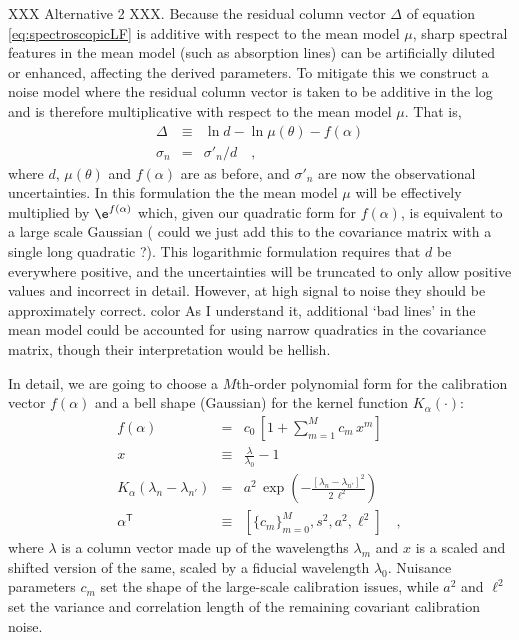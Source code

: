 \documentclass[iop,numberedappendix]{emulateapj}
\newcommand{\transpose}[1]{{#1}^{\!\mathsf T}}
\begin{document}
XXX Alternative 2 XXX.
Because the residual column vector $\Delta$ of equation
\ref{eq:spectroscopicLF} is additive with respect to the mean model
$\mu$, sharp spectral features in the mean model (such as absorption
lines) can be artificially diluted or enhanced, affecting the derived
parameters. To mitigate this we construct a noise model where the
residual column vector is taken to be additive in the log and is
therefore multiplicative with respect to the mean model $\mu$.  That
is,
\begin{eqnarray}\label{eq:spectroscopicLFalt2} 
\Delta &\equiv&
\ln d - \ln \mu(\theta) - f(\alpha) \\
\sigma_{n} & = & \sigma'_n / d
\quad ,
\end{eqnarray}
where $d$, $\mu(\theta)$ and $f(\alpha)$ are as before, and
$\sigma'_{n}$ are now the observational uncertainties. In this
formulation the the mean model $\mu$ will be effectively multiplied by
$\e ^{f(\alpha)}$ which, given our quadratic form for $f(\alpha)$, is
equivalent to a large scale Gaussian ({\color{red} could we just add
this to the covariance matrix with a single long quadratic ?}).  This
logarithmic formulation requires that $d$ be everywhere positive, and
the uncertainties will be truncated to only allow positive values and
incorrect in detail.  However, at high signal to noise they should be
approximately correct. {color{\red} As I understand it, additional
`bad lines' in the mean model could be accounted for using narrow
quadratics in the covariance matrix, though their interpretation would
be hellish.}



In detail, we are going to choose a $M$th-order polynomial form for
the calibration vector $f(\alpha)$ and a bell shape (Gaussian) for the
kernel function $K_\alpha(\cdot)$:
\begin{eqnarray}\displaystyle
f(\alpha) &=& c_0\,[1 + \sum_{m=1}^M c_m\,x^m]
\\
x &\equiv& \frac{\lambda}{\lambda_0} - 1
\\
K_\alpha(\lambda_n - \lambda_{n'}) &=& a^2\,\exp(-\frac{[\lambda_n - \lambda_{n'}]^2}{2\,\ell^2})
\\
\transpose{\alpha} &\equiv& \left[ \{c_m\}_{m=0}^M, s^2, a^2, \ell^2 \right]
\quad ,
\end{eqnarray}
where $\lambda$ is a column vector made up of the wavelengths $\lambda_m$
and $x$ is a scaled and shifted version of the same,
scaled by a fiducial wavelength $\lambda_0$.
Nuisance parameters $c_m$ set the shape of the large-scale calibration
issues, while $a^2$ and $\ell^2$ set the variance and correlation
length of the remaining covariant calibration noise.
\end{document}
